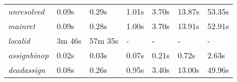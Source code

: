 \begin{table}[htbp]
\begin{center}
{\begin{tabular}{|l|l|l|l|l|l|l|}
				\rowcolor{light_green_3}
				\textit{unresolved} & 0.09s & 0.29s & 1.01s & 3.70s & 13.87s & 53.35s \\
				\rowcolor{light_green_3}
				\textit{mainret} & 0.09s & 0.28s & 1.00s & 3.70s & 13.91s & 52.91s \\
				\rowcolor{light_red_3}
				\textit{localid} & 3m 46s & 57m 35s & - & - & - & - \\
				\rowcolor{light_green_3}
				\textit{assignbinop} & 0.02s & 0.03s & 0.07s & 0.21s & 0.72s & 2.63s \\
				\rowcolor{light_green_3}
				\textit{deadassign} & 0.08s & 0.26s & 0.95s & 3.40s & 13.00s & 49.96s \\

\end{tabular}}
\end{center}
\end{table}
